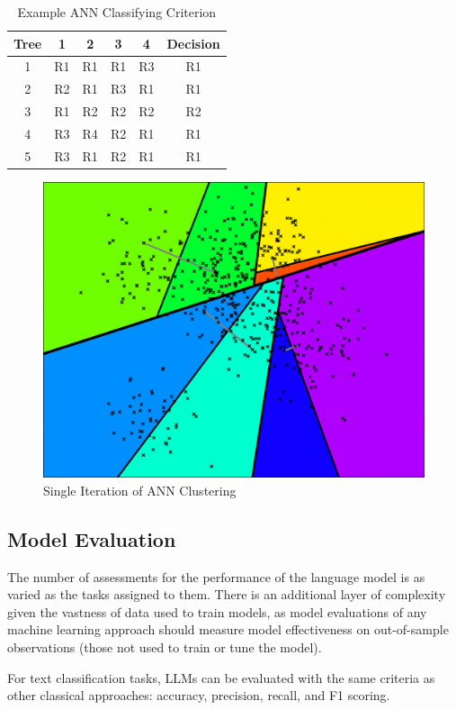 \documentclass[12pt]{article}
\begin{document}
\begin{table}
    \centering
    \begin{tabular}{|c|c|c|c|c|c|}
      \hline
      Tree & 1 & 2 & 3 & 4 & Decision\\
      \hline
       1  & R1 & R1  & R1 & R3 & R1\\
       2  & R2 & R1  & R3 & R1 & R1\\
       3  & R1 & R2  & R2 & R2 & R2\\
       4  & R3 & R4  & R2 & R1 & R1\\
       5  & R3 & R1  & R2 & R1 & R1\\
       \hline
    \end{tabular}
    \caption{Example ANN Classifying Criterion}
    \label{tab:ANN-class}
\end{table}

\begin{center}
    

\end{center}
\begin{figure}
    \centering
    \includegraphics[width=0.5\linewidth]{images/tree-3-1024x793.png}
    \caption{Single Iteration of ANN Clustering \cite{ANNOYBern}}
    \label{fig:ANN}
\end{figure}


\subsection{Model Evaluation}
The number of assessments for the performance of the language model is as varied as the tasks assigned to them. There is an additional layer of complexity given the vastness of data used to train models, as model evaluations of any machine learning approach should measure model effectiveness on out-of-sample observations (those not used to train or tune the model). 

For text classification tasks, LLMs can be evaluated with the same criteria as other classical approaches: accuracy, precision, recall, and F1 scoring. 
\end{document}
